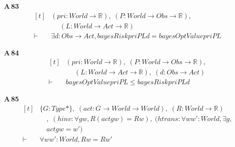 \noindent\textbf{A\,83}\quad{}
{\footnotesize\[ \begin{aligned}[t]
&(\mathit{pri} : \mathit{World} \to \mathbb{R} ),\; (\mathit{P} : \mathit{World} \to \mathit{Obs} \to \mathbb{R} ),\\
&\quad \; (\mathit{L} : \mathit{World} \to \mathit{Act} \to \mathbb{R} )\\
\vdash\;&\exists \mathit{d} : \mathit{Obs} \to \mathit{Act}, \mathit{bayesRisk} \mathit{pri} \mathit{P} \mathit{L} \mathit{d} = \mathit{bayesOptValue} \mathit{pri} \mathit{P} \mathit{L}
\end{aligned} \]}

\noindent\textbf{A\,84}\quad{}
{\footnotesize\[ \begin{aligned}[t]
&(\mathit{pri} : \mathit{World} \to \mathbb{R} ),\; (\mathit{P} : \mathit{World} \to \mathit{Obs} \to \mathbb{R} ),\\
&\quad \; (\mathit{L} : \mathit{World} \to \mathit{Act} \to \mathbb{R} ),\; (\mathit{d} : \mathit{Obs} \to \mathit{Act})\\
\vdash\;&\mathit{bayesOptValue} \mathit{pri} \mathit{P} \mathit{L} \leq \mathit{bayesRisk} \mathit{pri} \mathit{P} \mathit{L} \mathit{d}
\end{aligned} \]}

\noindent\textbf{A\,85}\quad{}
{\footnotesize\[ \begin{aligned}[t]
&\{ \mathit{G} : \mathit{Type}*\},\; (\mathit{act} : \mathit{G} \to \mathit{World} \to \mathit{World}),\; (\mathit{R} : \mathit{World} \to \mathbb{R} )\\
&\quad ,\; (\mathit{hinv} : \forall \mathit{g} \mathit{w}, \mathit{R} (\mathit{act} \mathit{g} \mathit{w}) = \mathit{R} \mathit{w}),\; (\mathit{htrans} : \forall \mathit{w} \mathit{w'} : \mathit{World}, \exists \mathit{g},\\
&\quad \mathit{act} \mathit{g} \mathit{w} = \mathit{w'})\\
\vdash\;&\forall \mathit{w} \mathit{w'} : \mathit{World}, \mathit{R} \mathit{w} = \mathit{R} \mathit{w'}
\end{aligned} \]}


